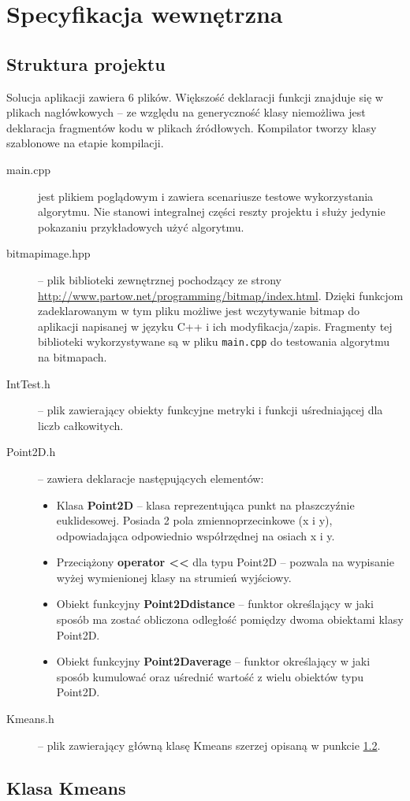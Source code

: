 \section{Specyfikacja wewnętrzna}

\subsection{Struktura projektu}

Solucja aplikacji zawiera 6 plików. Większość deklaracji funkcji znajduje się w plikach nagłówkowych -- ze względu na generyczność klasy niemożliwa jest deklaracja fragmentów kodu w plikach źródłowych. Kompilator tworzy klasy szablonowe na etapie kompilacji.

\begin{description}
	\item[main.cpp] jest plikiem poglądowym i zawiera scenariusze testowe wykorzystania algorytmu. Nie stanowi integralnej części reszty projektu i służy jedynie pokazaniu przykładowych użyć algorytmu.
	\item[bitmap\textunderscore image.hpp] -- plik biblioteki zewnętrznej pochodzący ze strony \url{http://www.partow.net/programming/bitmap/index.html}. Dzięki funkcjom zadeklarowanym w tym pliku możliwe jest wczytywanie bitmap do aplikacji napisanej w języku C++ i ich modyfikacja/zapis. Fragmenty tej biblioteki wykorzystywane są w pliku \texttt{main.cpp} do testowania algorytmu na bitmapach.
	\item[IntTest.h] -- plik zawierający obiekty funkcyjne metryki i funkcji uśredniającej dla liczb całkowitych.
	\item[Point\textunderscore 2D.h] -- zawiera deklaracje następujących elementów:
	\begin{itemize}
		\item Klasa \textbf{Point\textunderscore 2D} -- klasa reprezentująca punkt na płaszczyźnie euklidesowej. Posiada 2 pola zmiennoprzecinkowe (x i y), odpowiadająca odpowiednio współrzędnej na osiach x i y.
		\item Przeciążony \textbf{operator <<} dla typu Point\textunderscore 2D -- pozwala na wypisanie wyżej wymienionej klasy na strumień wyjściowy.
		\item Obiekt funkcyjny \textbf{Point2D\textunderscore distance} -- funktor określający w jaki sposób ma zostać obliczona odległość pomiędzy dwoma obiektami klasy Point\textunderscore 2D.
		\item Obiekt funkcyjny \textbf{Point2D\textunderscore average} -- funktor określający w jaki sposób kumulować oraz uśrednić wartość z wielu obiektów typu Point\textunderscore 2D.
	\end{itemize}
	\item[K\textunderscore means.h] -- plik zawierający główną klasę K\textunderscore means szerzej opisaną w punkcie \ref{kmeans}.
\end{description}

\subsection{Klasa K\textunderscore means}\label{kmeans}